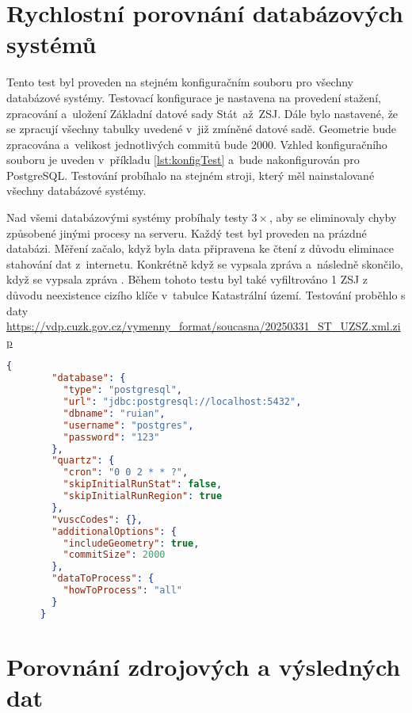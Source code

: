 \section{Rychlostní porovnání databázových systémů}
Tento test byl proveden na stejném konfiguračním souboru pro všechny databázové systémy.
Testovací konfigurace je nastavena na provedení stažení, zpracování a~uložení Základní datové sady Stát~až~ZSJ. 
Dále bylo nastavené, že se zpracují všechny tabulky uvedené v~již zmíněné datové sadě.
Geometrie bude zpracována a~velikost jednotlivých commitů bude 2000.
Vzhled konfiguračního souboru je uveden v~příkladu \ref{lst:konfigTest} a~bude nakonfigurován pro PostgreSQL.
Testování probíhalo na stejném stroji, který měl nainstalované všechny databázové systémy.

Nad všemi databázovými systémy probíhaly testy \(3\times\), aby se eliminovaly chyby způsobené jinými procesy na serveru.
Každý test byl proveden na prázdné databázi.
Měření začalo, když byla data připravena ke čtení z důvodu eliminace stahování dat z~internetu.
Konkrétně když se vypsala zpráva  a~následně skončilo, když se 
vypsala zpráva .
Během tohoto testu byl také vyfiltrováno 1 ZSJ z důvodu neexistence cizího klíče v~tabulce Katastrální území.
Testování proběhlo s daty \url{https://vdp.cuzk.gov.cz/vymenny_format/soucasna/20250331_ST_UZSZ.xml.zip}

\small
\begin{lstlisting}[language=json, caption={Konfigurační soubor pro test rychlosti}, label={lst:konfigTest}]
    {
        "database": {
          "type": "postgresql",
          "url": "jdbc:postgresql://localhost:5432",
          "dbname": "ruian",
          "username": "postgres",
          "password": "123"
        },
        "quartz": {
          "cron": "0 0 2 * * ?",
          "skipInitialRunStat": false,
          "skipInitialRunRegion": true
        },
        "vuscCodes": {},
        "additionalOptions": {
          "includeGeometry": true,
          "commitSize": 2000
        },
        "dataToProcess": {
          "howToProcess": "all"
        }
      }    
\end{lstlisting}
\normalsize

\section{Porovnání zdrojových a výsledných dat}

